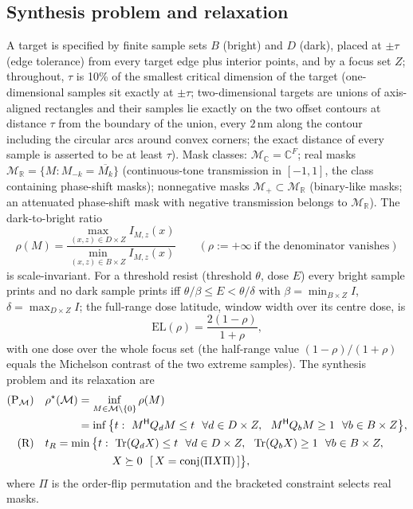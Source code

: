 \documentclass[11pt,a4paper]{article}
\newcommand{\SI}[2]{\ensuremath{#1\,\mathrm{#2}}}\newcommand{\SIrange}[3]{\ensuremath{#1\text{--}#2\,\mathrm{#3}}}
\theoremstyle{remark}\newtheorem*{remark}{Remark}
\newcommand{\R}{\mathbb{R}}\newcommand{\C}{\mathbb{C}}\newcommand{\PSD}{\succeq 0}
\DeclareMathOperator{\Tr}{Tr}\DeclareMathOperator{\rank}{rank}\DeclareMathOperator{\conj}{conj}
\newcommand{\I}{I}\newcommand{\rhostar}{\rho^{\star}}\newcommand{\NA}{\mathrm{NA}}\newcommand{\EL}{\mathrm{EL}}
\begin{document}
\subsection{Synthesis problem and relaxation}
A target is specified by finite sample sets $B$ (bright) and $D$ (dark), placed at $\pm\tau$ (edge tolerance) from every target edge plus interior points, and by a focus set $Z$; throughout, $\tau$ is 10\% of the smallest critical dimension of the target (one-dimensional samples sit exactly at $\pm\tau$; two-dimensional targets are unions of axis-aligned rectangles and their samples lie exactly on the two offset contours at distance $\tau$ from the boundary of the union, every $\SI{2}{nm}$ along the contour including the circular arcs around convex corners; the exact distance of every sample is asserted to be at least $\tau$). Mask classes: $\mathcal M_\C=\C^F$; real masks $\mathcal M_\R=\{M:M_{-k}=\overline{M_k}\}$ (continuous-tone transmission in $[-1,1]$, the class containing phase-shift masks); nonnegative masks $\mathcal M_+\subset\mathcal M_\R$ (binary-like masks; an attenuated phase-shift mask with negative transmission belongs to $\mathcal M_\R$). The dark-to-bright ratio
\begin{equation}\label{eq:rho}
\rho(M)=\frac{\max_{(x,z)\in D\times Z}\I_{M,z}(x)}{\min_{(x,z)\in B\times Z}\I_{M,z}(x)}\qquad(\rho:=+\infty\ \text{if the denominator vanishes})
\end{equation}
is scale-invariant. For a threshold resist (threshold $\theta$, dose $E$) every bright sample prints and no dark sample prints iff $\theta/\beta\le E<\theta/\delta$ with $\beta=\min_{B\times Z}\I$, $\delta=\max_{D\times Z}\I$; the full-range dose latitude, window width over its centre dose, is
\begin{equation}\label{eq:el}
\EL(\rho)=\frac{2(1-\rho)}{1+\rho},
\end{equation}
with one dose over the whole focus set (the half-range value $(1-\rho)/(1+\rho)$ equals the Michelson contrast of the two extreme samples). The synthesis problem and its relaxation are
\begin{align}
(\mathrm P_{\mathcal M})\quad & \rhostar(\mathcal M)=\inf_{M\in\mathcal M\setminus\{0\}}\rho(M)\nonumber\\
 &\hphantom{\rhostar(\mathcal M)}= \inf\big\{t:\ M^{\mathsf H}Q_dM\le t\ \ \forall d\in D\times Z,\ \ M^{\mathsf H}Q_bM\ge1\ \ \forall b\in B\times Z\big\},\\
(\mathrm R)\quad & t_R=\min\big\{t:\ \Tr(Q_dX)\le t\ \ \forall d\in D\times Z,\ \ \Tr(Q_bX)\ge1\ \ \forall b\in B\times Z,\nonumber\\
 &\hphantom{t_R=\min\big\{t:\ }X\PSD\ \ [\,X=\conj(\Pi X\Pi)\,]\big\},\label{eq:R}
\end{align}
where $\Pi$ is the order-flip permutation and the bracketed constraint selects real masks.
\end{document}
